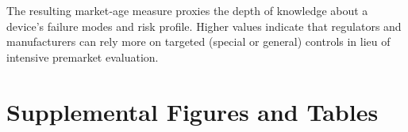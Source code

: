 \documentclass[letterpaper,12pt]{article}
\theoremstyle{definition}
\begin{document}
The resulting market‐age measure proxies the depth of knowledge about a device’s failure modes and risk profile. Higher values indicate that regulators and manufacturers can rely more on targeted (special or general) controls in lieu of intensive premarket evaluation.



 \clearpage
\newpage

 \section{Supplemental Figures and Tables}\label{sec:SuppFigTab}



    




    




\end{document}
